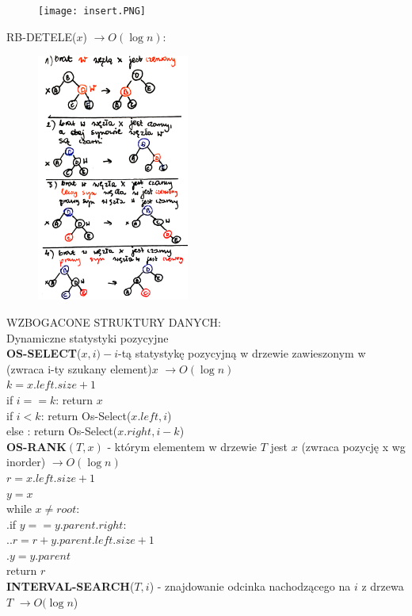 \documentclass[8pt,a3paper]{article}
\begin{document}
\begin{multicols*}{3}
\begin{figure}[H]
		 	\texttt{[image: insert.PNG]}
	 \end{figure}
	 \vspace{-0.65cm}
	RB-DETELE($x$) $\to O(\log n)$:  \\
	\vspace{-0.75cm}
	 \begin{figure}[H]
		 	\includegraphics[width=5cm]{delete.PNG}
	 \end{figure}
	 \vspace{-0.55cm}
	WZBOGACONE STRUKTURY DANYCH: \\Dynamiczne statystyki pozycyjne \\
	\textbf{OS-SELECT}($x,i) - i$-tą statystykę pozycyjną w drzewie zawieszonym w (zwraca i-ty szukany element)$x$ $\to O(\log n)$ \\
	$k = x.left.size+1$ \\
	if $i==k$: return $x$ \\
	if $i<k$: return Os-Select($x.left,i$)\\
	else : return Os-Select($x.right, i-k$)\\	
	\textbf{OS-RANK}$(T,x)$ - którym elementem w drzewie $T$ jest $x$ (zwraca pozycję x wg inorder)  $\to O(\log n)$\\
	$r = x.left.size+1$ \\
	$y=x$ \\
	while $x \neq root$: \\
	.\quad if $y == y.parent.right$:\\
	.\quad .\quad $r = r+ y.parent.left.size+1$ \\
	.\quad $y = y.parent$ \\
	return $r$ \\
	\textbf{INTERVAL-SEARCH}($T,i$) - znajdowanie odcinka nachodzącego na $i$ z drzewa $T$ $\to O( \log n$)\\

\end{multicols*}
\end{document}
